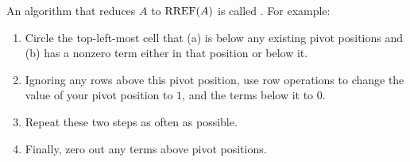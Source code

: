 
\begin{applicationActivities}{3}{6}

\begin{definition}
  An algorithm that reduces \(A\) to \(\operatorname{RREF}(A)\) is called
  . For example:
  \begin{multicols}{3}
    \begin{enumerate}
      \item Circle the top-left-most cell that (a) is below any existing pivot
      positions and (b) has a nonzero term either in that position or below it.
      \item Ignoring any rows above this pivot position, use row operations
      to change the value of your pivot position to \(1\), and the terms below
      it to \(0\).
      \item Repeat these two steps as often as possible.
      \item Finally,
      zero out any terms above pivot positions.
    \end{enumerate}
  \end{multicols}
\end{definition}


\end{applicationActivities}
